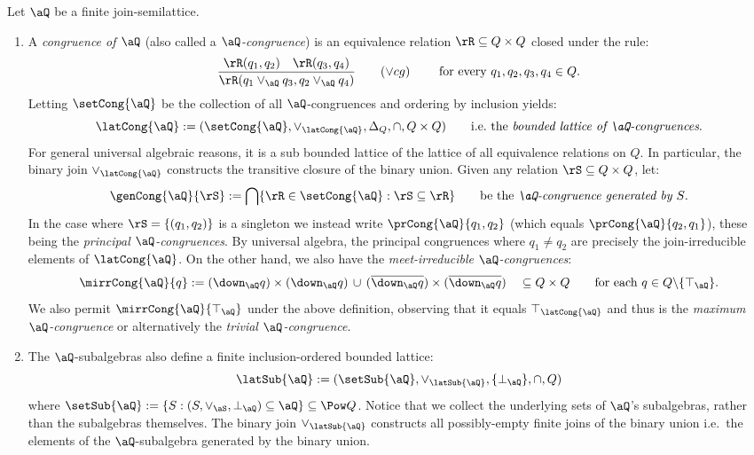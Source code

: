 \documentclass{article}
\begin{document}
\begin{definition}
\label{def:jsl_cong_sub_lattices}
\item
Let $\aQ$ be a finite join-semilattice.
\begin{enumerate}
\item
A \emph{congruence of $\aQ$} (also called a \emph{$\aQ$-congruence}) is an equivalence relation $\rR \subseteq Q \times Q$ closed under the rule:
\[
\dfrac{\rR(q_1,q_2) \quad \rR(q_3,q_4)}{\rR(q_1 \lor_\aQ q_3, q_2 \lor_\aQ q_4)}
\qquad
(\lor cg)
\qquad\
\text{for every $q_1,q_2,q_3,q_4 \in Q$.}
\]
Letting $\setCong{\aQ}$ be the collection of all $\aQ$-congruences and ordering by inclusion yields:
\[
\latCong{\aQ} 
:= (\setCong{\aQ},\lor_{\latCong{\aQ}},\Delta_Q,\cap,Q \times Q)
\qquad
\text{i.e.\ the \emph{bounded lattice of $\aQ$-congruences}.}
\]
For general universal algebraic reasons, it is a sub bounded lattice of the  lattice of all equivalence relations on $Q$. In particular, the binary join $\lor_{\latCong{\aQ}}$ constructs the transitive closure of the binary union. Given any relation $\rS \subseteq Q \times Q$, let:
\[
\genCong{\aQ}{\rS}
:= \bigcap \{ \rR \in \setCong{\aQ} : \rS \subseteq \rR \}
\qquad
\text{be the \emph{$\aQ$-congruence generated by $S$}.}
\]
In the case where $\rS = \{(q_1,q_2)\}$ is a singleton we instead write $\prCong{\aQ}{q_1,q_2}$ (which equals $\prCong{\aQ}{q_2,q_1}$), these being the \emph{principal $\aQ$-congruences}. By universal algebra, the principal congruences where $q_1 \neq q_2$ are precisely the join-irreducible elements of $\latCong{\aQ}$. On the other hand, we also have the \emph{meet-irreducible $\aQ$-congruences}:
\[
\mirrCong{\aQ}{q} := 
(\down_\aQ q)\times(\down_\aQ q) \,\cup\, (\overline{\down_\aQ q})\times(\overline{\down_\aQ q})
\quad \subseteq Q \times Q
\qquad
\text{for each $q \in Q \backslash \{\top_\aQ\}$.}
\]
We also permit $\mirrCong{\aQ}{\top_\aQ}$ under the above definition, observing that it equals $\top_{\latCong{\aQ}}$ and thus is the \emph{maximum $\aQ$-congruence} or alternatively the \emph{trivial $\aQ$-congruence}.

\item
The $\aQ$-subalgebras also define a finite inclusion-ordered bounded lattice:
\[
\latSub{\aQ} := (\setSub{\aQ},\lor_{\latSub{\aQ}},\{\bot_\aQ\},\cap,Q)
\]
where $\setSub{\aQ} := \{ S : (S,\lor_\aS,\bot_\aQ) \subseteq \aQ \} \subseteq \Pow Q$. Notice that we collect the underlying sets of $\aQ$'s subalgebras, rather than the subalgebras themselves. The binary join $\lor_{\latSub{\aQ}}$ constructs all possibly-empty finite joins of the binary union i.e.\ the elements of the $\aQ$-subalgebra generated by the binary union.


\end{enumerate}
\end{definition}
\end{document}
